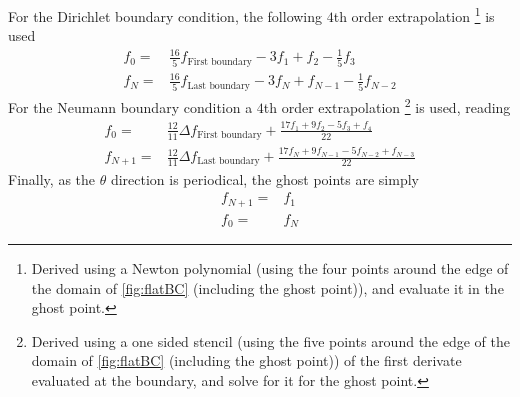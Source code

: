 For the Dirichlet boundary condition, the following $4$th order extrapolation %
%
\footnote{
Derived using a Newton polynomial (using the four points around the edge of the domain of \cref{fig:flatBC} (including the ghost point)), and evaluate it in the ghost point.
}%
is used
%
\begin{align*}
      f_{0} =& \frac{16}{5}f_{\text{First boundary}}
              - 3          f_1
              +            f_2
              - \frac{1}{5}f_3
    \\
      f_{N} =& \frac{16}{5}f_{\text{Last boundary}}
              - 3          f_{N}
              +            f_{N-1}
              - \frac{1}{5}f_{N-2}
\end{align*}
%
For the Neumann boundary condition a $4$th order extrapolation %
%
\footnote{
Derived using a one sided stencil (using the five points around the edge of the domain of \cref{fig:flatBC} (including the ghost point)) of the first derivate evaluated at the boundary, and solve for it for the ghost point.
}%
%
is used, reading
%
\begin{align*}
      f_0 =& \frac{12}{11}\Delta f_{\text{First boundary}}
                +
                \frac{
                  17f_1
                +  9f_2
                -  5f_3
                +   f_4
               }{22}
    \\
      f_{N+1} =& \frac{12}{11}\Delta f_{\text{Last boundary}}
                +
                \frac{
                  17f_{N}
                +  9f_{N-1}
                -  5f_{N-2}
                +   f_{N-3}
               }{22}
\end{align*}
%
Finally, as the $\theta$ direction is periodical, the ghost points are simply
%
\begin{align*}
    f_{N+1} =& f_{1}
    \\
    f_{0} =& f_{N}
\end{align*}
